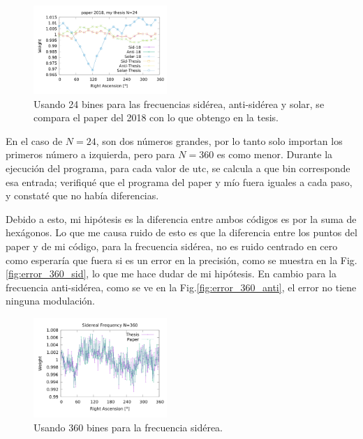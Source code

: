 \begin{figure}[H]
	\centering
	\includegraphics[width=0.45\textwidth]{solar_anti_sid_my_and_paper_in_24.png}
	\caption{Usando 24 bines para las frecuencias sidérea, anti-sidérea y solar, se compara el paper del 2018 con lo que obtengo en la tesis.}
	\label{fig:all_24}
\end{figure}


En el caso de $N=24$, son dos números grandes, por lo tanto solo importan los primeros número a izquierda, pero para  $N=360$ es como menor. Durante la ejecución del programa, para cada valor de utc, se calcula a que bin corresponde esa entrada; verifiqué que el programa del paper y mío fuera iguales a cada paso, y constaté que no había diferencias.

Debido a esto, mi hipótesis es la diferencia entre ambos códigos es por la suma de hexágonos. Lo que me causa ruido de esto es que la diferencia entre los puntos del paper y de mi código, para la frecuencia sidérea,  no es ruido centrado en cero como esperaría que fuera si es un error en la precisión, como se muestra en la Fig.\ref{fig:error_360_sid}, lo que me hace dudar de mi hipótesis. En cambio para la frecuencia anti-sidérea, como se ve en la Fig.\ref{fig:error_360_anti}, el error no tiene ninguna modulación.

\begin{figure}[H]
	\centering
	\includegraphics[width=0.45\textwidth]{sidereal_my_and_paper_in_360.png}
	\caption{Usando 360 bines para la frecuencia sidérea.}
	\label{fig:sid_360}
\end{figure}


